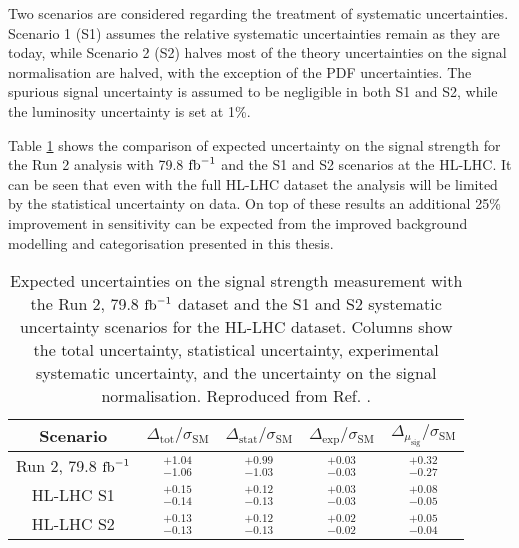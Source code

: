Two scenarios are considered regarding the treatment of systematic
uncertainties. Scenario 1 (S1) assumes the relative systematic
uncertainties remain as they are today, while Scenario 2 (S2)
halves most of the theory uncertainties on the signal normalisation
are halved, with the exception of the PDF uncertainties. The
spurious signal uncertainty is assumed to be negligible in both S1
and S2, while the luminosity uncertainty is set at 1\%.

Table \ref{tab:out:res} shows the comparison of expected uncertainty
on the signal strength for the Run 2 analysis with 79.8 $\text{fb}^{-1}$
and the S1 and S2 scenarios at the HL-LHC. It can be seen that 
even with the full HL-LHC dataset the analysis will be limited
by the statistical uncertainty on data. On top of these results
an additional 25\% improvement in sensitivity can be expected
from the improved background modelling and categorisation
presented in this thesis.

\begin{table}[htb]
  \renewcommand{\arraystretch}{1.3}
  \centering
  \caption{
    Expected uncertainties on the signal strength measurement with
    the Run 2, 79.8 $\text{fb}^{-1}$ dataset and the S1 and S2 systematic
    uncertainty scenarios for the HL-LHC dataset. Columns show
    the total uncertainty, statistical uncertainty, experimental
    systematic uncertainty, and the uncertainty on the signal
    normalisation.
    Reproduced from Ref. \cite{ATL-PHYS-PUB-2018-054}.}
  \label{tab:out:res}
  \begin{tabular}{ccccc}
    \toprule
    \midrule
    Scenario & $\Delta_\text{tot}/\sigma_\text{SM}$ 
             & $\Delta_\text{stat}/\sigma_\text{SM}$ 
             & $\Delta_\text{exp}/\sigma_\text{SM}$ 
             & $\Delta_{\mu_\text{sig}}/\sigma_\text{SM}$ \\
    \midrule
    Run 2, 79.8 $\text{fb}^{-1}$ & $^{+1.04}_{-1.06}$ & $^{+0.99}_{-1.03}$ & $^{+0.03}_{-0.03}$ & $^{+0.32}_{-0.27}$ \\
    HL-LHC S1          & $^{+0.15}_{-0.14}$ & $^{+0.12}_{-0.13}$ & $^{+0.03}_{-0.03}$ & $^{+0.08}_{-0.05}$ \\
    HL-LHC S2          & $^{+0.13}_{-0.13}$ & $^{+0.12}_{-0.13}$ & $^{+0.02}_{-0.02}$ & $^{+0.05}_{-0.04}$ \\
    \midrule
    \bottomrule
  \end{tabular}
\end{table}




